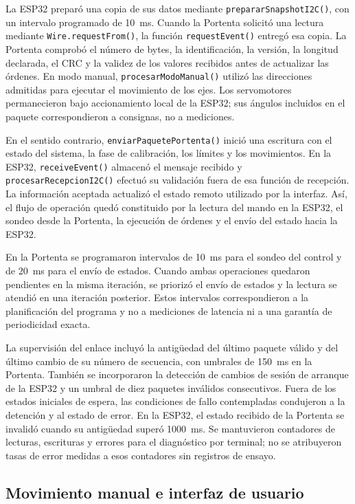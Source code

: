 La ESP32 preparó una copia de sus datos mediante \texttt{prepararSnapshotI2C()}, con un intervalo programado de 10~ms. Cuando la Portenta solicitó una lectura mediante \texttt{Wire.requestFrom()}, la función \texttt{requestEvent()} entregó esa copia. La Portenta comprobó el número de bytes, la identificación, la versión, la longitud declarada, el CRC y la validez de los valores recibidos antes de actualizar las órdenes. En modo manual, \texttt{procesarModoManual()} utilizó las direcciones admitidas para ejecutar el movimiento de los ejes. Los servomotores permanecieron bajo accionamiento local de la ESP32; sus ángulos incluidos en el paquete correspondieron a consignas, no a mediciones.

En el sentido contrario, \texttt{enviarPaquetePortenta()} inició una escritura con el estado del sistema, la fase de calibración, los límites y los movimientos. En la ESP32, \texttt{receiveEvent()} almacenó el mensaje recibido y \texttt{procesarRecepcionI2C()} efectuó su validación fuera de esa función de recepción. La información aceptada actualizó el estado remoto utilizado por la interfaz. Así, el flujo de operación quedó constituido por la lectura del mando en la ESP32, el sondeo desde la Portenta, la ejecución de órdenes y el envío del estado hacia la ESP32.

En la Portenta se programaron intervalos de 10~ms para el sondeo del control y de 20~ms para el envío de estados. Cuando ambas operaciones quedaron pendientes en la misma iteración, se priorizó el envío de estados y la lectura se atendió en una iteración posterior. Estos intervalos correspondieron a la planificación del programa y no a mediciones de latencia ni a una garantía de periodicidad exacta.

La supervisión del enlace incluyó la antigüedad del último paquete válido y del último cambio de su número de secuencia, con umbrales de 150~ms en la Portenta. También se incorporaron la detección de cambios de sesión de arranque de la ESP32 y un umbral de diez paquetes inválidos consecutivos. Fuera de los estados iniciales de espera, las condiciones de fallo contempladas condujeron a la detención y al estado de error. En la ESP32, el estado recibido de la Portenta se invalidó cuando su antigüedad superó 1000~ms. Se mantuvieron contadores de lecturas, escrituras y errores para el diagnóstico por terminal; no se atribuyeron tasas de error medidas a esos contadores sin registros de ensayo.

\subsection{Movimiento manual e interfaz de usuario}

